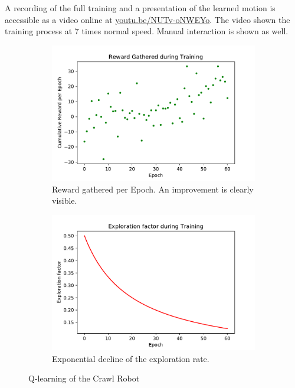 \documentclass[11pt, a4paper]{article}
\begin{document}
A recording of the full training and a presentation of the learned motion is accessible as a video online at \href{https://youtu.be/NUTv-oNWEYo}{youtu.be/NUTv-oNWEYo}. The video shown the training process at 7 times normal speed. Manual interaction is shown as well.

\begin{figure}
	\centering
	\begin{subfigure}{.48\textwidth}
		\centering
		\includegraphics[width=1\linewidth]{images/crawl_rewards}
		\caption{Reward gathered per Epoch. An improvement is clearly visible.}
		\label{fig:crawl_reward}
	\end{subfigure}
	\begin{subfigure}{.48\textwidth}
		\centering
		\includegraphics[width=1\linewidth]{images/crawl_exploration}
		\caption{Exponential decline of the exploration rate.}
		\label{fig:crawl_exploration}
	\end{subfigure}%
	\caption{Q-learning of the Crawl Robot}
	\label{fig:crawl_train}
\end{figure}
\end{document}
